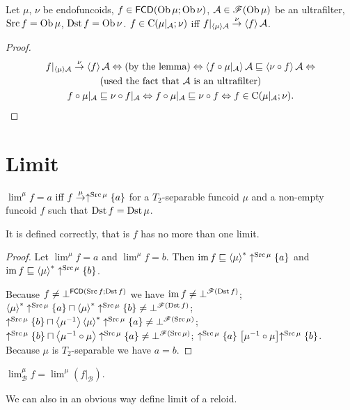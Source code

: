 \begin{thm}
Let $\mu$, $\nu$ be endofuncoids, $f\in\mathsf{FCD}(\operatorname{Ob}\mu;\operatorname{Ob}\nu)$,
$\mathcal{A}\in\mathscr{F}(\operatorname{Ob}\mu)$ be an ultrafilter, $\operatorname{Src} f=\operatorname{Ob}\mu$,
$\operatorname{Dst} f=\operatorname{Ob}\nu$. $f\in\mathrm{C}(\mu|_{\mathcal{A}};\nu)$ iff $f|_{\left\langle \mu\right\rangle\mathcal{A}}\overset{\nu}{\rightarrow}\left\langle f\right\rangle\mathcal{A}$.\end{thm}
\begin{proof}
~
\begin{multline*}
f|_{\left\langle \mu\right\rangle\mathcal{A}}\overset{\nu}{\rightarrow}\left\langle f\right\rangle\mathcal{A}\Leftrightarrow\text{(by the lemma)}\Leftrightarrow\left\langle f\circ\mu|_{\mathcal{A}}\right\rangle\mathcal{A}\sqsubseteq\left\langle \nu\circ f\right\rangle\mathcal{A}\Leftrightarrow\\
\text{(used the fact that \ensuremath{\mathcal{A}} is an ultrafilter)}\\
f\circ\mu|_{\mathcal{A}}\sqsubseteq\nu\circ f|_{\mathcal{A}}\Leftrightarrow f\circ\mu|_{\mathcal{A}}\sqsubseteq\nu\circ f\Leftrightarrow f\in\mathrm{C}(\mu|_{\mathcal{A}};\nu).
\end{multline*}

\end{proof}

\section{Limit}
\begin{defn}
$\lim^{\mu}f=a$ iff $f\overset{\mu}{\rightarrow}\uparrow^{\operatorname{Src}\mu}\{a\}$
for a $T_{2}$-separable funcoid $\mu$ and a non-empty funcoid $f$
such that $\operatorname{Dst} f=\operatorname{Dst}\mu$.
\end{defn}
It is defined correctly, that is $f$ has no more than one limit.
\begin{proof}
Let $\lim^{\mu}f=a$ and $\lim^{\mu}f=b$. Then $\operatorname{im} f\sqsubseteq\left\langle \mu\right\rangle ^{\ast}\uparrow^{\operatorname{Src}\mu}\{a\}$
and $\operatorname{im} f\sqsubseteq\left\langle \mu\right\rangle ^{\ast}\uparrow^{\operatorname{Src}\mu}\{b\}$.

Because $f\ne\bot^{\mathsf{FCD}(\operatorname{Src} f;\operatorname{Dst} f)}$ we have $\operatorname{im} f\ne\bot^{\mathscr{F}(\operatorname{Dst} f)}$;
$\left\langle \mu\right\rangle ^{\ast}\uparrow^{\operatorname{Src}\mu}\{a\}\sqcap\left\langle \mu\right\rangle ^{\ast}\uparrow^{\operatorname{Src}\mu}\{b\}\ne\bot^{\mathscr{F}(\operatorname{Dst} f)}$;
$\uparrow^{\operatorname{Src}\mu}\{b\}\sqcap\left\langle \mu^{-1}\right\rangle\left\langle \mu\right\rangle ^{\ast}\uparrow^{\operatorname{Src}\mu}\{a\}\ne\bot^{\mathscr{F}(\operatorname{Src}\mu)}$;
$\uparrow^{\operatorname{Src}\mu}\{b\}\sqcap\left\langle \mu^{-1}\circ\mu\right\rangle\uparrow^{\operatorname{Src}\mu}\{a\}\ne\bot^{\mathscr{F}(\operatorname{Src}\mu)}$;
$\uparrow^{\operatorname{Src}\mu}\{a\}\mathrel{\left[\mu^{-1}\circ\mu\right]}\uparrow^{\operatorname{Src}\mu}\{b\}$.
Because $\mu$ is $T_{2}$-separable we have $a=b$.\end{proof}
\begin{defn}
$\lim_{\mathcal{B}}^{\mu}f=\lim^{\mu}(f|_{\mathcal{B}})$.\end{defn}
\begin{rem}
We can also in an obvious way define limit of a reloid.
\end{rem}

